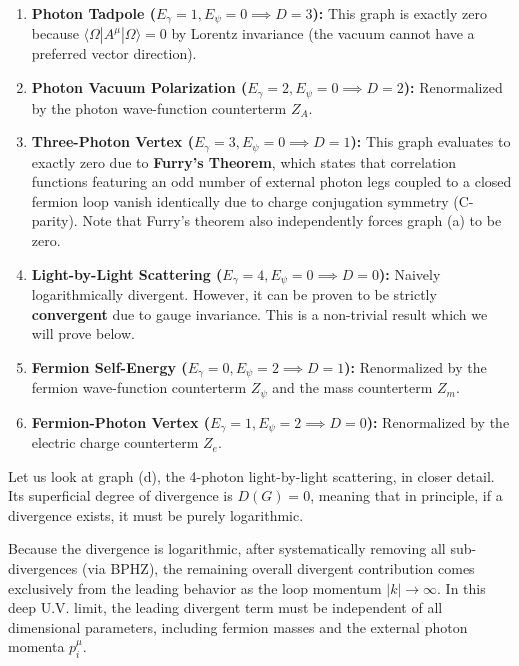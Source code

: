 \begin{enumerate}[label=(\alph*)]
    \item \textbf{Photon Tadpole ($E_\gamma=1, E_\psi=0 \implies D=3$):} This graph is exactly zero because $\langle \Omega | A^\mu | \Omega \rangle = 0$ by Lorentz invariance (the vacuum cannot have a preferred vector direction).
    \item \textbf{Photon Vacuum Polarization ($E_\gamma=2, E_\psi=0 \implies D=2$):} Renormalized by the photon wave-function counterterm $Z_A$.
    \item \textbf{Three-Photon Vertex ($E_\gamma=3, E_\psi=0 \implies D=1$):} This graph evaluates to exactly zero due to \textbf{Furry's Theorem}, which states that correlation functions featuring an odd number of external photon legs coupled to a closed fermion loop vanish identically due to charge conjugation symmetry (C-parity). Note that Furry's theorem also independently forces graph (a) to be zero.
    \item \textbf{Light-by-Light Scattering ($E_\gamma=4, E_\psi=0 \implies D=0$):} Naively logarithmically divergent. However, it can be proven to be strictly \textbf{convergent} due to gauge invariance. This is a non-trivial result which we will prove below.
    \item \textbf{Fermion Self-Energy ($E_\gamma=0, E_\psi=2 \implies D=1$):} Renormalized by the fermion wave-function counterterm $Z_\psi$ and the mass counterterm $Z_m$.
    \item \textbf{Fermion-Photon Vertex ($E_\gamma=1, E_\psi=2 \implies D=0$):} Renormalized by the electric charge counterterm $Z_e$.
\end{enumerate}

Let us look at graph (d), the 4-photon light-by-light scattering, in closer detail. Its superficial degree of divergence is $D(G) = 0$, meaning that in principle, if a divergence exists, it must be purely logarithmic.


Because the divergence is logarithmic, after systematically removing all sub-divergences (via BPHZ), the remaining overall divergent contribution comes exclusively from the leading behavior as the loop momentum $|k| \to \infty$. In this deep U.V. limit, the leading divergent term must be independent of all dimensional parameters, including fermion masses and the external photon momenta $p_i^\mu$.


